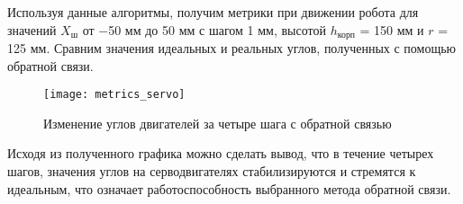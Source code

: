 Используя данные алгоритмы, получим метрики при движении робота для значений $X_{\text{ш}}$ от $-$50 мм до 50 мм с шагом 1 мм, высотой $h_\text{корп}$ = 150 мм и $r$ = 125 мм. Сравним значения идеальных и реальных углов, полученных с помощью обратной связи.

\begin{figure}[h!]
	\begin{center}
		\texttt{[image: metrics\_servo]}
		\caption{Изменение углов двигателей за четыре шага с обратной связью}
		\label{metrics_servo}
	\end{center}
\end{figure}

Исходя из полученного графика можно сделать вывод, что в течение четырех шагов, значения углов на серводвигателях стабилизируются и стремятся к идеальным, что означает работоспособность выбранного метода обратной связи.
\newpage

